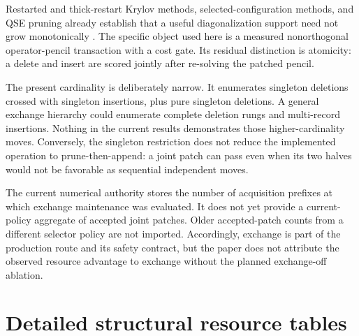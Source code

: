 \documentclass[
  reprint,
  amsmath,
  amssymb,
  aps,
  pra,
  nofootinbib,
  superscriptaddress,
  floatfix
]{revtex4-2}
\begin{document}
Restarted and thick-restart Krylov methods, selected-configuration methods,
and QSE pruning already establish that a useful diagonalization support need
not grow monotonically \cite{WuSimon2000ThickRestart,Sorensen1992IRA}.  The
specific object used here is a measured nonorthogonal operator-pencil
transaction with a cost gate.  Its residual distinction is atomicity: a
delete and insert are scored jointly after re-solving the patched pencil.

The present cardinality is deliberately narrow.  It enumerates singleton
deletions crossed with singleton insertions, plus pure singleton deletions.
A general exchange hierarchy could enumerate complete deletion rungs and
multi-record insertions.  Nothing in the current results demonstrates those
higher-cardinality moves.  Conversely, the singleton restriction does not
reduce the implemented operation to prune-then-append: a joint patch can pass
even when its two halves would not be favorable as sequential independent
moves.

The current numerical authority stores the number of acquisition prefixes at
which exchange maintenance was evaluated.  It does not yet provide a
current-policy aggregate of accepted joint patches.  Older accepted-patch
counts from a different selector policy are not imported.  Accordingly,
exchange is part of the production route and its safety contract, but the
paper does not attribute the observed resource advantage to exchange without
the planned exchange-off ablation.

\section{Detailed structural resource tables}
\label{app:resource_tables}
\end{document}
